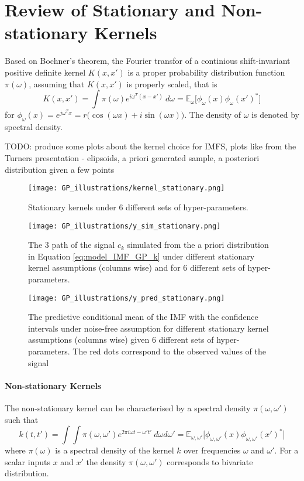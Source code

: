 \section{Review of Stationary and Non-stationary Kernels}
Based on Bochner's theorem, the Fourier transfor of a continious shift-invariant positive definite kernel $K(x,x')$ is a proper probability distribution function $\pi(\omega)$, assuming that $K(x,x')$ is properly scaled, that is
\begin{equation}
K(x,x') = \int \pi(\omega) e^{ i \omega^T (x - x') }\ d\omega = \mathbb{E}_{\omega}\big[ \phi_\omega (x) \phi_\omega (x')^* \big] 
\end{equation}
for $\phi_\omega (x)  =e^{j \omega^T x} = r \big( \cos (\omega x ) + i \sin (\omega x )\big)$. The density of $\omega$ is denoted by spectral density. 


TODO: produce some plots about the kernel choice for IMFS, plots like from the Turners presentation - elipsoids, a priori generated sample, a posteriori distribution given a few points


\begin{figure}[H]
\centering
\texttt{[image: GP\_illustrations/kernel\_stationary.png]}
\caption{Stationary kernels under 6 different sets of hyper-parameters.}\label{fig:}
\end{figure}

\begin{figure}[H]
\centering
\texttt{[image: GP\_illustrations/y\_sim\_stationary.png]}
\caption{The 3 path of the signal $c_k$ simulated from the a priori distribution in Equation \eqref{eq:model_IMF_GP_k} under different stationary kernel assumptions (columns wise) and for 6 different sets of hyper-parameters.}\label{fig:}
\end{figure}

\begin{figure}[H]
\centering
\texttt{[image: GP\_illustrations/y\_pred\_stationary.png]}
\caption{The predictive conditional mean of the IMF with the confidence intervals  under  noise-free assumption for different stationary kernel assumptions (columns wise) given 6 different sets of hyper-parameters. The red dots correspond to the observed values of the signal}\label{fig:}
\end{figure}



\paragraph{Non-stationary Kernels}
The non-stationary kernel can be characterised by a spectral density $\pi(\omega,\omega')$ such that
\begin{equation}
k(t,t') =\int \int \pi(\omega,\omega') e^{ 2 \pi i \omega t - \omega' t' }\ d\omega d\omega' = \mathbb{E}_{\omega,\omega'}\big[ \phi_{\omega,\omega'} (x) \phi_{\omega,\omega'} (x')^* \big] 
\end{equation}
where $\pi(\omega)$ is a spectral density of the kernel $k$ over frequencies $\omega$ and $\omega'$. For a scalar inputs $x$ and $x'$ the density $\pi(\omega,\omega')$ corresponds to bivariate distribution. 

